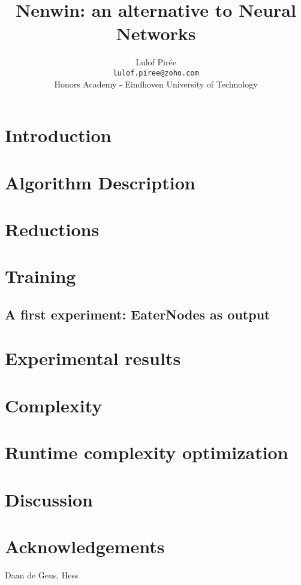 \documentclass{scrartcl}
\title{Nenwin: an alternative to Neural Networks}
\author{Lulof Pirée\\\footnotesize\texttt{lulof.piree@zoho.com}\\\small{Honors Academy - Eindhoven University of Technology}\\}
\newcommand{\hl}[1]{{\color{red}#1}} %
\begin{document}
    \maketitle
    
    
    
    \section{Introduction}
    
    
    \section{Algorithm Description}
        
    
    \section{Reductions}
    
    
    \section{Training}
    
    
    \subsection{A first experiment: EaterNodes as output}
    
    
    \section{Experimental results}
    
    
    \section{Complexity}
    
    
    \section{Runtime complexity optimization}
    

    \section{Discussion}
    
    
    \section{Acknowledgements}
    \hl{Daan de Geus, Hess}
    \printbibliography[
    heading=bibintoc,
    title={References}
    ]
    
    \appendix
    
    
\end{document}
